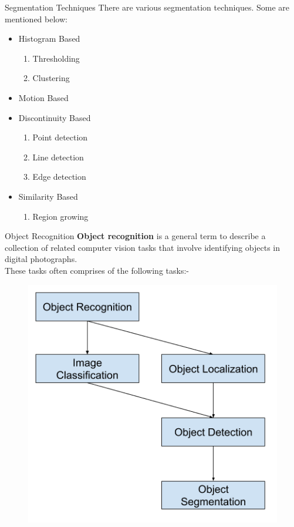 \documentclass[12pt]{beamer}
\begin{document}
\begin{frame}{Segmentation Techniques}
There are various segmentation techniques. Some are mentioned below:
\begin{itemize}
\item Histogram Based \\
\begin{enumerate}
\item Thresholding
\item Clustering
\end{enumerate}
\item Motion Based
\item Discontinuity Based \\
\begin{enumerate}
\item Point detection
\item Line detection
\item Edge detection
\end{enumerate}
\item Similarity Based \\
\begin{enumerate}
\item Region growing
\end{enumerate}
\end{itemize}
\end{frame}
\begin{frame}{Object Recognition}
\textbf{Object recognition} is a general term to describe a collection of related computer vision tasks that involve identifying objects in digital photographs.
\\ [1ex]
These tasks often comprises of the following tasks:-
\\[1ex]
\begin{figure}
\begin{center}
\includegraphics[scale=0.4]{obj.png}
\end{center}
\end{figure}
\end{frame}
\end{document}
